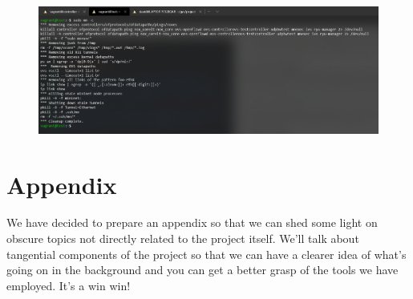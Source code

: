 \documentclass[12pt]{article}
\begin{document}
	\begin{figure}[!htb]
		\centering
		\includegraphics[width=\linewidth]{mn_clean.png}
		\label{f:mn_clean}
	\end{figure}
	
\newpage
\section{Appendix}
	We have decided to prepare an appendix so that we can shed some light on obscure topics not directly related to the project itself. We'll talk about tangential components of the project so that we can have a clearer idea of what's going on in the background and you can get a better grasp of the tools we have employed. It's a win win!
\end{document}
